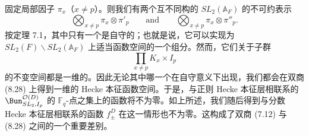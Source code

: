 固定局部因子 $\pi_x$（$x\neq p$）。则我们有两个互不同构的 $SL_2(\mathbb{A}_F)$ 的不可约表示
\[
\bigotimes_{x\neq p}\pi_x\otimes \pi'_p \qquad\text{and}\qquad \bigotimes_{x\neq p}\pi_x\otimes \pi''_p.
\]
按定理 7.1，其中只有一个是自守的；也就是说，它可以实现为 $SL_2(F)\backslash SL_2(\mathbb{A}_F)$ 上适当函数空间的一个组分。然而，它们关于子群
\[
\prod_{x\neq p} K_x\times I_p
\]
的不变空间都是一维的。因此无论其中哪一个在自守意义下出现，我们都会在双商
(8.28) 上得到一维的 Hecke 本征函数空间。于是，与正则 Hecke 本征层相联系的 $\Bun^{\mathcal{O}(D)}_{SL_2,I_p}$ 的 $\mathbb{F}_q$-点之集上的函数将不为零。如上所述，我们随后得到与分数 Hecke 本征层相联系的函数 $f^D_\pm$ 在这一情形也不为零。这构成了双商 (7.12) 与 (8.28) 之间的一个重要差别。

